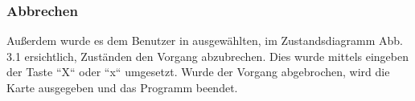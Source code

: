 \documentclass{report}
\begin{document}
\subsubsection{Abbrechen}
Außerdem wurde es dem Benutzer in ausgewählten, im Zustandsdiagramm Abb. 3.1 ersichtlich, Zuständen den Vorgang abzubrechen. Dies wurde mittels eingeben der Taste ``X`` oder ``x`` umgesetzt. Wurde der Vorgang abgebrochen, wird die Karte ausgegeben und das Programm beendet.
\end{document}
